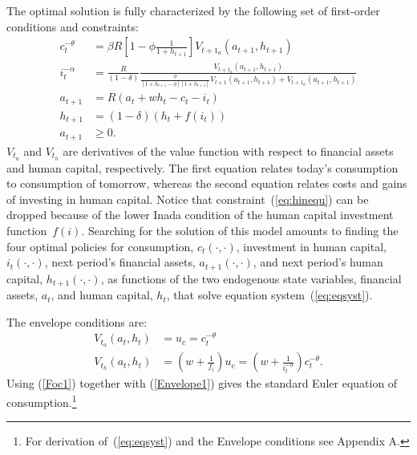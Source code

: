 \documentclass[a4paper,12pt]{article}%
\begin{document}
The optimal solution is fully characterized by the following set of first-order conditions and constraints:
\begin{subequations}
\label{eq:eqsyst}
\begin{align}
c_{t}^{-\theta}  &  = \beta R\left[ 1-\phi\frac{1}{1+h_{t+1}}\right]\text{$V_{t+1_{a}}$}\left( a_{t+1},h_{t+1}\right) \label{Foc1} \\
i_{t}^{-\alpha}  &  = \frac{R}{\left( 1-\delta\right)}\frac{\text{$V_{t+1_{a}}$}\left( a_{t+1},h_{t+1}\right)  }{\frac{\phi}{\left[1+h_{t+1}-\phi\right]  \left[  1+h_{t+1}\right]  }V_{t+1}\left(a_{t+1},h_{t+1}\right)  +\text{$V_{t+1_{h}}$}\left(  a_{t+1},h_{t+1}\right)} \label{Foc2} \\
a_{t+1}  &  = R\left( a_{t}+wh_{t}-c_{t}-i_{t}\right) \\
h_{t+1}  &  = \left( 1-\delta\right)  \left(  h_{t}+f\left(  i_{t}\right)\right) \\
a_{t+1}  &  \geq0.
\end{align}
\end{subequations}
$V_{t_{a}}$ and $V_{t_{h}}$ are derivatives of the value function with respect to financial assets and human capital, respectively. The first equation relates today's consumption to consumption of tomorrow, whereas the second equation relates costs and gains of investing in human capital. Notice that constraint~(\ref{eq:hinequ}) can be dropped because of the lower Inada condition of the human capital investment function~$f(i)$. Searching for the solution of this model amounts to finding the four optimal policies for consumption, $c_{t}\left( \cdot,\cdot\right)$, investment in human capital, $i_{t}\left(  \cdot,\cdot\right)$, next period's financial assets, $a_{t+1}\left( \cdot,\cdot\right)$, and next period's human capital, $h_{t+1}\left(  \cdot,\cdot\right)$, as functions of the two endogenous state variables, financial assets, $a_{t}$, and human capital, $h_{t}$, that solve equation system~(\ref{eq:eqsyst}).

The envelope conditions are:
\begin{subequations}
\begin{align}
\text{$V_{t_{a}}$}\left( a_{t},h_{t}\right)  &  =u_{c}=c_{t}^{-\theta} \label{Envelope1}\\
\text{$V_{t_{h}}$}\left( a_{t},h_{t}\right)  &  =\left(  w+\frac{1}{f_{i}}\right) u_{c}=\left( w+\frac{1}{i_{t}^{-\alpha}}\right) c_{t}^{-\theta}\text{.} \label{Envelope2}
\end{align}
\end{subequations}
Using (\ref{Foc1}) together with (\ref{Envelope1}) gives the standard Euler equation of consumption.\footnote{For derivation of~(\ref{eq:eqsyst}) and the Envelope conditions see Appendix A.}
\end{document}
